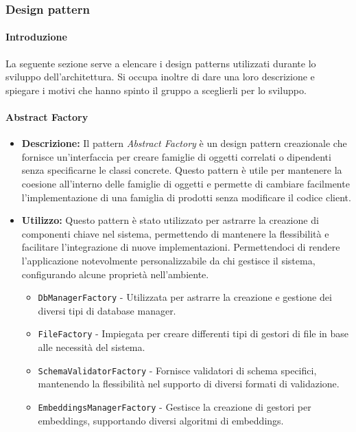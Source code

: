 \subsubsection{Design pattern}
\paragraph{Introduzione}
\par La seguente sezione serve a elencare i design patterns utilizzati durante lo sviluppo dell'architettura. Si occupa inoltre di dare una loro descrizione e spiegare i motivi che hanno spinto il gruppo a sceglierli per lo sviluppo.

\paragraph{Abstract Factory}
\begin{itemize}
    \item{\textbf{Descrizione:}} Il pattern \textit{Abstract Factory} è un design pattern creazionale che fornisce un'interfaccia per creare famiglie di oggetti correlati o dipendenti senza specificarne le classi concrete. Questo pattern è utile per mantenere la coesione all'interno delle famiglie di oggetti e permette di cambiare facilmente l'implementazione di una famiglia di prodotti senza modificare il codice client.
    \item{\textbf{Utilizzo:}} Questo pattern è stato utilizzato per astrarre la creazione di componenti chiave nel sistema, permettendo di mantenere la flessibilità e facilitare l'integrazione di nuove implementazioni. Permettendoci di rendere l'applicazione notevolmente personalizzabile da chi gestisce il sistema, configurando alcune proprietà nell'ambiente.
    \begin{itemize}
        \item \texttt{DbManagerFactory} - Utilizzata per astrarre la creazione e gestione dei diversi tipi di database manager.
        \item \texttt{FileFactory} - Impiegata per creare differenti tipi di gestori di file in base alle necessità del sistema.
        \item \texttt{SchemaValidatorFactory} - Fornisce validatori di schema specifici, mantenendo la flessibilità nel supporto di diversi formati di validazione.
        \item \texttt{EmbeddingsManagerFactory} - Gestisce la creazione di gestori per embeddings, supportando diversi algoritmi di embeddings.
    \end{itemize}
\end{itemize}

